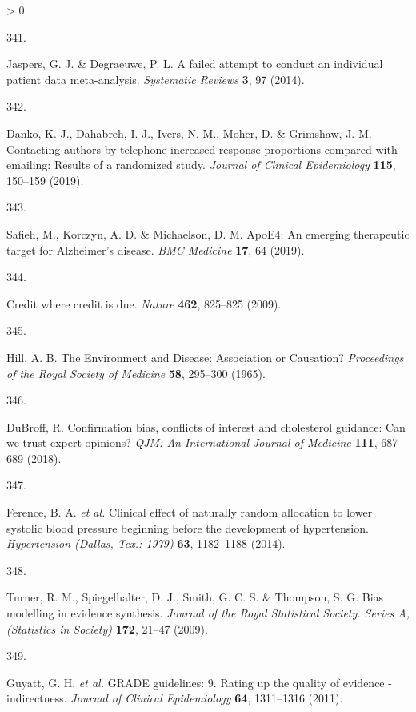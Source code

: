 \documentclass[a4paper, twoside]{templates/ociamthesis}
\newlength{\cslhangindent}
\newlength{\csllabelwidth}
\newenvironment{CSLReferences}[3] %
 {%
  \setlength{\parindent}{0pt}
  \ifodd #1 \everypar{\setlength{\hangindent}{\cslhangindent}}\ignorespaces\fi
  \ifnum #2 > 0
  \setlength{\parskip}{#2\baselineskip}
  \fi
 }%
 {}
\newcommand{\CSLLeftMargin}[1]{\parbox[t]{\maxof{\widthof{#1}}{\csllabelwidth}}{#1}}
\newcommand{\CSLRightInline}[1]{\parbox[t]{\linewidth - \csllabelwidth}{#1}}
\begin{document}
\begin{CSLReferences}{0}{0}
\leavevmode\hypertarget{ref-jaspers2014}{}%
\CSLLeftMargin{341. }
\CSLRightInline{Jaspers, G. J. \& Degraeuwe, P. L. A failed attempt to conduct an individual patient data meta-analysis. \emph{Systematic Reviews} \textbf{3}, 97 (2014).}

\leavevmode\hypertarget{ref-danko2019}{}%
\CSLLeftMargin{342. }
\CSLRightInline{Danko, K. J., Dahabreh, I. J., Ivers, N. M., Moher, D. \& Grimshaw, J. M. Contacting authors by telephone increased response proportions compared with emailing: Results of a randomized study. \emph{Journal of Clinical Epidemiology} \textbf{115}, 150--159 (2019).}

\leavevmode\hypertarget{ref-safieh2019}{}%
\CSLLeftMargin{343. }
\CSLRightInline{Safieh, M., Korczyn, A. D. \& Michaelson, D. M. {ApoE4}: An emerging therapeutic target for {Alzheimer}'s disease. \emph{BMC Medicine} \textbf{17}, 64 (2019).}

\leavevmode\hypertarget{ref-nature2009}{}%
\CSLLeftMargin{344. }
\CSLRightInline{Credit where credit is due. \emph{Nature} \textbf{462}, 825--825 (2009).}

\leavevmode\hypertarget{ref-hill1965}{}%
\CSLLeftMargin{345. }
\CSLRightInline{Hill, A. B. The {Environment} and {Disease}: Association or {Causation}? \emph{Proceedings of the Royal Society of Medicine} \textbf{58}, 295--300 (1965).}

\leavevmode\hypertarget{ref-dubroff2018}{}%
\CSLLeftMargin{346. }
\CSLRightInline{DuBroff, R. Confirmation bias, conflicts of interest and cholesterol guidance: Can we trust expert opinions? \emph{QJM: An International Journal of Medicine} \textbf{111}, 687--689 (2018).}

\leavevmode\hypertarget{ref-ference2014}{}%
\CSLLeftMargin{347. }
\CSLRightInline{Ference, B. A. \emph{et al.} Clinical effect of naturally random allocation to lower systolic blood pressure beginning before the development of hypertension. \emph{Hypertension (Dallas, Tex.: 1979)} \textbf{63}, 1182--1188 (2014).}

\leavevmode\hypertarget{ref-turner2009}{}%
\CSLLeftMargin{348. }
\CSLRightInline{Turner, R. M., Spiegelhalter, D. J., Smith, G. C. S. \& Thompson, S. G. Bias modelling in evidence synthesis. \emph{Journal of the Royal Statistical Society. Series A, (Statistics in Society)} \textbf{172}, 21--47 (2009).}

\leavevmode\hypertarget{ref-guyatt2011}{}%
\CSLLeftMargin{349. }
\CSLRightInline{Guyatt, G. H. \emph{et al.} {GRADE} guidelines: 9. {Rating} up the quality of evidence - indirectness. \emph{Journal of Clinical Epidemiology} \textbf{64}, 1311--1316 (2011).}


\end{CSLReferences}
\end{document}
